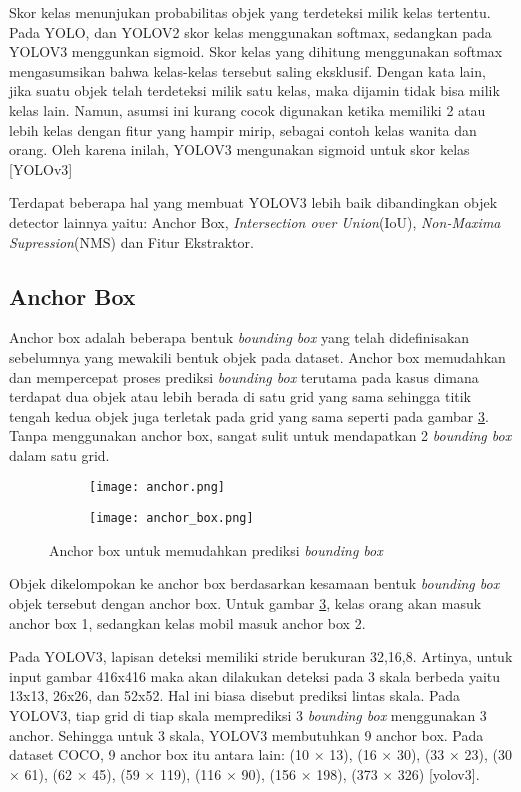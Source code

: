 \documentclass[../thesis.tex]{subfiles}
\begin{document}
Skor kelas menunjukan probabilitas objek yang terdeteksi milik kelas tertentu. Pada YOLO, dan YOLOV2 skor kelas menggunakan softmax, sedangkan pada YOLOV3 menggunkan sigmoid.
Skor kelas yang dihitung menggunakan softmax mengasumsikan bahwa kelas-kelas tersebut saling eksklusif. Dengan kata lain, jika suatu objek telah terdeteksi milik satu kelas, maka dijamin tidak bisa milik kelas lain. 
Namun, asumsi ini kurang cocok digunakan ketika memiliki 2 atau lebih kelas dengan fitur yang hampir mirip, sebagai contoh kelas wanita dan orang. Oleh karena inilah, YOLOV3 mengunakan sigmoid untuk skor kelas [YOLOv3]

Terdapat beberapa hal yang membuat YOLOV3 lebih baik dibandingkan objek detector lainnya yaitu: Anchor Box, \textit{Intersection over Union}(IoU), \textit{Non-Maxima Supression}(NMS) dan Fitur Ekstraktor.
\subsection{Anchor Box}
Anchor box adalah beberapa bentuk \textit{bounding box} yang telah didefinisakan sebelumnya yang mewakili bentuk objek pada dataset. Anchor box memudahkan dan mempercepat proses prediksi \textit{bounding box} terutama pada kasus dimana terdapat dua objek atau lebih berada di satu grid yang sama sehingga titik tengah kedua objek juga terletak pada grid yang sama seperti pada gambar \ref{anchor_box_merge}. 
Tanpa menggunakan anchor box, sangat sulit untuk mendapatkan 2 \textit{bounding box} dalam satu grid.

\begin{figure}[htp]
	\centering
	\begin{subfigure}{0.4\textwidth}
	  \texttt{[image: anchor.png]}
	  \caption{}
	  \label{ancor}
	\end{subfigure}
	\begin{subfigure}{0.4\textwidth}
	  \texttt{[image: anchor\_box.png]}
	  \caption{}
	  \label{anchor_box}
	\end{subfigure}
	\caption{Anchor box untuk memudahkan prediksi \textit{bounding box}}
	\label{anchor_box_merge}
  \end{figure}

Objek dikelompokan ke anchor box berdasarkan kesamaan bentuk \textit{bounding box} objek tersebut dengan anchor box. Untuk gambar \ref{anchor_box_merge}, kelas orang akan masuk anchor box 1, sedangkan kelas mobil masuk anchor box 2.

Pada YOLOV3, lapisan deteksi memiliki stride berukuran 32,16,8. Artinya, untuk input gambar 416x416 maka akan dilakukan deteksi pada 3 skala berbeda yaitu 13x13, 26x26, dan 52x52. Hal ini biasa disebut prediksi lintas skala.
Pada YOLOV3, tiap grid di tiap skala memprediksi 3 \textit{bounding box} menggunakan 3 anchor. Sehingga untuk 3 skala, YOLOV3 membutuhkan 9 anchor box. Pada dataset COCO, 9 anchor box itu antara lain: (10 × 13), (16 × 30), (33 × 23), (30 × 61), (62 × 45), (59 ×
119), (116 × 90), (156 × 198), (373 × 326) [yolov3].
\end{document}
